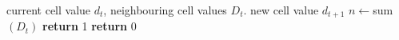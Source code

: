 \begin{algorithmic}[1]
\Require current cell value $d_t$, neighbouring cell values $D_t$.
\Ensure new cell value $d_{t+1}$
\State $n \leftarrow $sum$(D_t)$
  \State \textbf{return} 1
\Else
  \State \textbf{return} 0
\EndIf
\end{algorithmic}
